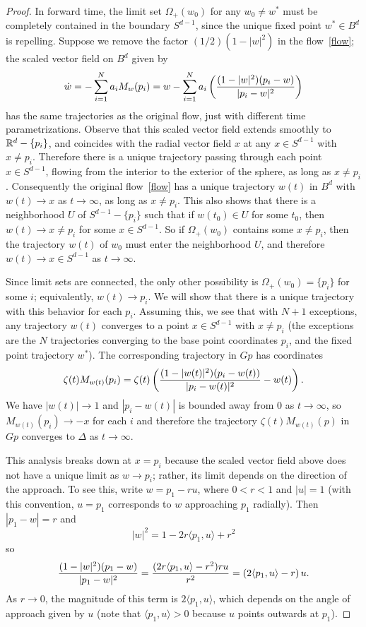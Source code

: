 \documentclass[%
 aip,
 amsmath,amssymb,
 reprint,%
]{revtex4-1}
\begin{document}
\begin{proof}
In forward time, the limit set $\Omega_+(w_0)$ for any $w_0 \ne w^\ast$ must be completely contained in the boundary $S^{d-1}$, since the unique fixed point $w^\ast \in B^d$ is repelling.
Suppose we remove the factor $(1/2) (1 - |w|^2)$ in the flow~\eqref{flow}; the scaled vector field on $B^d$ given by
\begin{equation}
\dot w = -\sum_{i = 1}^N a_i M_w(p_i) = w -\sum_{i = 1}^N a_i  \left ( {(1-|w|^2) (p_i - w) \over |p_i - w |^2 }  \right ) \label{scaledsystem}
\end{equation}
has the same trajectories as the original flow, just with different time parametrizations.  Observe that this scaled vector field extends smoothly to ${\Bbb R}^d - \{p_i\}$, and coincides with the radial vector field $x$ at any $x \in S^{d-1}$ with $x \ne p_i$.  Therefore there is a unique trajectory passing through each point $x \in S^{d-1}$, flowing from the interior to the exterior of the sphere, as long as $x \ne p_i$.  Consequently the original flow~\eqref{flow} has a unique trajectory $w(t)$ in $B^d$ with $w(t) \to x$ as $t \to \infty$, as long as $x \ne p_i$.  This also shows that there is a neighborhood $U$ of $S^{d-1} -\{p_i\}$ such that if $w(t_0) \in U$ for some $t_0$, then $w(t) \to x \ne p_i$ for some $x \in S^{d-1}$.  So if $\Omega_+(w_0)$ contains some $x \ne p_i$, then the trajectory $w(t)$ of $w_0$ must enter the neighborhood $U$, and therefore $w(t) \to x \in S^{d-1}$ as $t \to \infty$.

Since limit sets are connected, the only other possibility is $\Omega_+(w_0) = \{ p_i \}$ for some $i$; equivalently, $w(t) \to p_i$.  We will show that there is a unique trajectory with this behavior for each $p_i$.  Assuming this, we see that with $N+1$ exceptions, any trajectory $w(t)$ converges to a point $x \in S^{d-1}$ with $x \ne p_i$ (the exceptions are the $N$ trajectories converging to the base point coordinates $p_i$, and the fixed point trajectory $w^\ast$).  The corresponding trajectory in $Gp$ has coordinates
$$
\zeta(t) M_{w(t)} (p_i) = \zeta(t) \left ( {(1-|w(t)|^2) (p_i - w(t)) \over |p_i - w(t)|^2 } - w(t) \right ).
$$
We have $|w(t)| \to 1$ and $ |p_i - w(t)|$ is bounded away from $0$ as $t \to \infty$, so $M_{w(t)} (p_i)  \to -x$ for each $i$ and therefore the trajectory $\zeta(t) M_{w(t)} (p)$ in $Gp$ converges to $\Delta$ as $t \to \infty$. 

This analysis breaks down at $x = p_i$ because the scaled vector field above does not have a unique limit as $w \to p_i$; rather, its limit depends on the direction of the approach.  To see this, write $w = p_1 -r u$, where $0 < r < 1$ and $| u | = 1$ (with this convention, $u = p_1$ corresponds to $w$ approaching $p_1$ radially).  Then $|p_1 - w| = r$ and 
$$
 |w |^2 = 1 - 2r \langle p_1, u \rangle + r^2
$$
so
$$
 {(1-|w|^2) (p_1 - w) \over |p_1 - w |^2 } = { (2r \langle p_1, u \rangle - r^2 ) ru \over r^2} =  \left ( 2\langle p_1, u \rangle - r \right) u.
 $$
As $r \to 0$, the magnitude of this term is $2 \langle p_1, u \rangle$, which depends on the angle of approach given by $u$
(note that $ \langle p_1, u \rangle > 0 $ because $u$ points outwards at $p_1$).


\end{proof}
\end{document}
